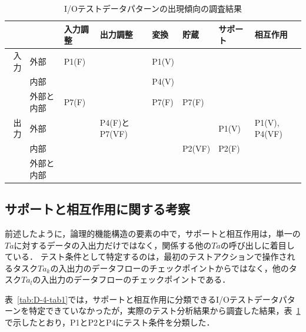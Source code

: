 \begin{table}[htbp]
  \centering
  \caption{I/Oテストデータパターンの出現傾向の調査結果}
    \begin{tabular}{|r|p{3em}|p{4em}|p{4em}|p{2.6em}|p{2.6em}|p{4em}|p{4em}|}
    \hline
          & \multicolumn{1}{l|}{} & \multicolumn{1}{p{4em}|}{入力調整} & \multicolumn{1}{p{4em}|}{出力調整} & \multicolumn{1}{p{3em}|}{変換} & \multicolumn{1}{p{3em}|}{貯蔵} & \multicolumn{1}{p{4em}|}{サポート} & \multicolumn{1}{p{4em}|}{相互作用} \bigstrut\\
    \hline
    \hline
    \multicolumn{1}{|p{1.3em}|}{入力} & 外部 & P1(F) &       & P1(V) &       &       &  \bigstrut\\
\cline{2-8}          & 内部 &       &       & P4(V) &       &       &  \bigstrut\\
\cline{2-8}          & 外部と内部 & \multicolumn{1}{p{4em}|}{P7(F)} &       & \multicolumn{1}{p{4em}|}{P7(F)} & \multicolumn{1}{p{4em}|}{P7(F)} &       &  \bigstrut\\
    \hline
    \multicolumn{1}{|p{1.3em}|}{出力}  & 外部 &       & P4(F)とP7(VF) &       &       & P1(V) & \multicolumn{1}{|p{3em}|}{P1(V), P4(VF)} \bigstrut\\
\cline{2-8}          & 内部 &       &       &       & \multicolumn{1}{p{4em}|}{P2(VF)} & P2(F) &  \bigstrut\\
\cline{2-8}\cline{8-8}          & 外部と内部 &       &       &       &       &       &  \bigstrut\\
    \hline
    \end{tabular}%
  \label{tab:ioresult}%
\end{table}%

\subsection{サポートと相互作用に関する考察}
前述したように，論理的機能構造の要素の中で，サポートと相互作用は，単一の$Ta$に対するデータの入出力だけではなく，関係する他の$Ta$の呼び出しに着目している．
テスト条件として特定するのは，最初のテストアクションで操作されるタスク$Ta_k$の入出力のデータフローのチェックポイントからではなく，他のタスク$Ta_l$の入出力のデータフローのチェックポイントである．

表~\ref{tab:D-4-tab1}では，サポートと相互作用に分類できるI/Oテストデータパターンを特定できていなかったが，実際のテスト分析結果から調査した結果，表~\ref{tab:ioresult}で示したとおり，P1とP2とP4にテスト条件を分類した．

